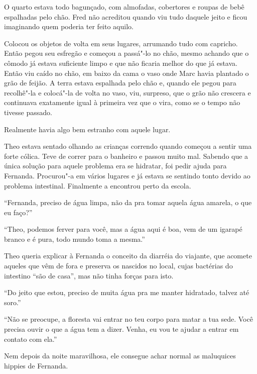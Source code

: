\asterisc


O quarto estava todo bagunçado, com almofadas, cobertores e roupas de
bebê espalhadas pelo chão. Fred não acreditou quando viu tudo daquele
jeito e ficou imaginando quem poderia ter feito aquilo.

Colocou os objetos de volta em seus lugares, arrumando tudo com
capricho. Então pegou seu esfregão e começou a passá"-lo no chão, mesmo
achando que o cômodo já estava suficiente limpo e que não ficaria melhor
do que já estava. Então viu caído no chão, em baixo da cama o vaso onde
Marc havia plantado o grão de feijão. A terra estava espalhada pelo chão
e, quando ele pegou para recolhê"-la e colocá"-la de volta no vaso, viu,
surpreso, que o grão não crescera e continuava exatamente igual à
primeira vez que o vira, como se o tempo não tivesse passado.

Realmente havia algo bem estranho com aquele lugar.

\asterisc


Theo estava sentado olhando as
crianças correndo quando começou a sentir uma forte cólica. Teve de
correr para o banheiro e passou muito mal. Sabendo que a única solução
para aquele problema era se hidratar, foi pedir ajuda para Fernanda.
Procurou"-a em vários lugares e já estava se sentindo tonto devido ao
problema intestinal. Finalmente a encontrou perto da escola.

``Fernanda, preciso de água limpa, não da pra tomar aquela água amarela,
o que eu faço?''

``Theo, podemos ferver para você, mas a água aqui é boa, vem de um
igarapé branco e é pura, todo mundo toma a mesma.''

Theo queria explicar à Fernanda o conceito da diarréia do viajante, que
acomete aqueles que vêm de fora e preserva os nascidos no local, cujas
bactérias do intestino ``são de casa'', mas não tinha forças para isto.

``Do jeito que estou, preciso de muita água pra me manter hidratado,
talvez até soro.''

``Não se preocupe, a floresta vai entrar no teu corpo para matar a tua
sede. Você precisa ouvir o que a água tem a dizer. Venha, eu vou te
ajudar a entrar em contato com ela.''

Nem depois da noite maravilhosa, ele consegue achar normal as maluquices
hippies de Fernanda.

